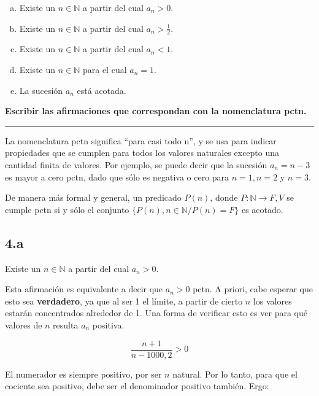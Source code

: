 \documentclass{article}
\newcommand{\subsectionx}[1]{\subsection*{#1}\label{subsec:#1}\addcontentsline{toc}{subsection}{\nameref{subsec:#1}}}
\begin{document}
\begin{enumerate}[(a)]

\bfseries

\item Existe un $ n \in \mathbb{N} $ a partir del cual $ a_n > 0 $.

\item Existe un $ n \in \mathbb{N} $ a partir del cual $ a_n > \frac{1}{2} $.

\item Existe un $ n \in \mathbb{N} $ a partir del cual $ a_n < 1 $.

\item Existe un $ n \in \mathbb{N} $ para el cual $ a_n = 1 $.

\item La sucesión $ a_n $ está acotada.

\end{enumerate}

\textbf{ Escribir las afirmaciones que correspondan con la nomenclatura pctn. }

\vspace{1em}
\hrule
\vspace{1em}

La nomenclatura pctn significa ``para casi todo n'', y se usa para indicar propiedades que se cumplen para todos los valores naturales excepto una cantidad finita de valores. Por ejemplo, se puede decir que la sucesión $ a_n = n-3 $ es mayor a cero pctn, dado que sólo es negativa o cero para $ n = 1, n=2 $ y $n=3$.

De manera más formal y general, un predicado $P(n)$, donde $P:\mathbb{N} \rightarrow {F, V}$ se cumple pctn si y sólo el conjunto $ \{ P(n), n \in \mathbb{N} / P(n) = F  \} $ es acotado.

\subsectionx{4.a}

Existe un $ n \in \mathbb{N} $ a partir del cual $ a_n > 0 $.

Esta afirmación es equivalente a decir que $ a_n > 0 $ pctn. A priori, cabe esperar que esto sea \textbf{verdadero}, ya que al ser 1 el límite, a partir de cierto $ n $ los valores estarán concentrados alrededor de 1. Una forma de verificar esto es ver para qué valores de $ n $ resulta $ a_n $ positiva.

\begin{equation}
\frac{n+1}{n-1000, 2} > 0
\end{equation}

El numerador es siempre positivo, por ser $ n $ natural. Por lo tanto, para que el cociente sea positivo, debe ser el denominador positivo también. Ergo:
\end{document}
